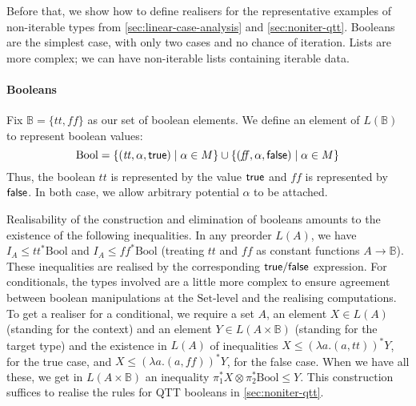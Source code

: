\documentclass[acmsmall,screen]{acmart}
\newcommand{\Set}{\mathrm{Set}}
\begin{document}
Before that, we show how to define realisers for the representative
examples of non-iterable types from \autoref{sec:linear-case-analysis}
and \autoref{sec:noniter-qtt}. Booleans are the simplest case, with
only two cases and no chance of iteration. Lists are more complex; we
can have non-iterable lists containing iterable data.

\paragraph{Booleans} Fix $\mathbb{B} = \{ \mathit{tt}, \mathit{ff} \}$
as our set of boolean elements. We define an element of
$L(\mathbb{B})$ to represent boolean values:
\begin{displaymath}
  \mathrm{Bool} = \{ (\mathit{tt}, \alpha, \mathsf{true}) \mid \alpha \in M \} \cup \{ (\mathit{ff}, \alpha, \mathsf{false}) \mid \alpha \in M \}
\end{displaymath}
Thus, the boolean $\mathit{tt}$ is represented by the value $\mathsf{true}$
and $\mathit{ff}$ is represented by $\mathsf{false}$. In both case, we
allow arbitrary potential $\alpha$ to be attached.

Realisability of the construction and elimination of booleans amounts
to the existence of the following inequalities. In any preorder
$L(A)$, we have $I_A \leq \mathit{tt}^* \mathrm{Bool}$ and
$I_A \leq \mathit{ff}^* \mathrm{Bool}$ (treating $\mathit{tt}$ and
$\mathit{ff}$ as constant functions $A \to \mathbb{B}$). These
inequalities are realised by the corresponding $\mathsf{true}/\mathsf{false}$
expression. For conditionals, the types involved are a little more
complex to ensure agreement between boolean manipulations at the
$\Set$-level and the realising computations. To get a realiser for a
conditional, we require a set $A$, an element $X \in L(A)$ (standing for
the context) and an element $Y \in L(A \times \mathbb{B})$ (standing
for the target type) and the existence in $L(A)$ of inequalities
$X \leq (\lambda a. (a, \mathit{tt}))^* Y$, for the true case, and
$X \leq (\lambda a. (a, \mathit{ff}))^* Y$, for the false case. When
we have all these, we get in $L(A \times \mathbb{B})$ an inequality
$\pi_1^* X \otimes \pi_2^* \mathrm{Bool} \leq Y$. This construction
suffices to realise the rules for QTT booleans in
\autoref{sec:noniter-qtt}.
\end{document}
